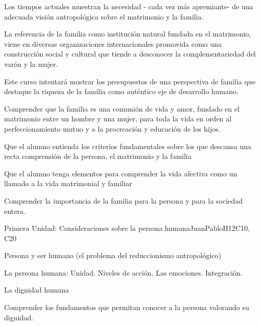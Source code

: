 \begin{syllabus}


\begin{justification}
Los tiempos actuales muestran la necesidad - cada vez más apremiante-  de una adecuada visión antropológica sobre el matrimonio y la familia.

La referencia de la familia como institución natural fundada en el matrimonio, viene en diversas organizaciones internacionales promovida como una construcción social y cultural que tiende a desconocer la complementariedad del varón y la mujer.

Este curso intentará mostrar los presupuestos de una perspectiva de familia que destaque la riqueza de la familia como auténtico eje de desarrollo humano.
\end{justification}

\begin{goals}
	\item Comprender que la familia es una comunión de vida y amor, fundado en el matrimonio entre un hombre y una mujer, para toda la vida en orden al perfeccionamiento mutuo y a la procreación y educación de los hijos.
	\item Que el alumno entienda los criterios fundamentales sobre los que descansa una recta comprensión de la persona, el matrimonio y la familia
	\item Que el alumno tenga elementos para comprender la vida afectiva como un llamado a la vida matrimonial y familiar
	\item Comprender la importancia de la familia para la persona y para la sociedad entera.
\end{goals}



\begin{unit}{}{Primera Unidad: Consideraciones sobre la persona humana}{JuanPabloII}{12}{C10, C20}
\begin{topics}
	\item Persona y ser humano (el problema del reduccionismo antropológico)
	\item La persona humana: Unidad. Niveles de acción. Las emociones. Integración.
	\item La dignidad humana
\end{topics}

\begin{learningoutcomes}
	\item Comprender los fundamentos que permitan conocer a la persona valorando su dignidad.
\end{learningoutcomes}
\end{unit}


\end{syllabus}
